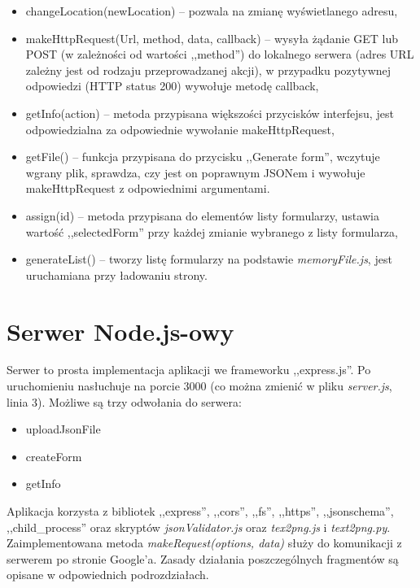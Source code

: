 \begin{itemize}
\item changeLocation(newLocation) -- pozwala na zmianę wyświetlanego adresu,
\item makeHttpRequest(Url, method, data, callback) -- wysyła żądanie GET lub POST (w zależności od wartości ,,method'') do lokalnego serwera (adres URL zależny jest od rodzaju przeprowadzanej akcji), w przypadku pozytywnej odpowiedzi (HTTP status 200) wywołuje metodę callback,
\item getInfo(action) -- metoda przypisana większości przycisków interfejsu, jest odpowiedzialna za odpowiednie wywołanie makeHttpRequest,
\item getFile() -- funkcja przypisana do przycisku ,,Generate form'', wczytuje wgrany plik, sprawdza, czy jest on poprawnym JSONem i wywołuje makeHttpRequest z odpowiednimi argumentami.
\item assign(id) -- metoda przypisana do elementów listy formularzy, ustawia wartość ,,selectedForm'' przy każdej zmianie wybranego z listy formularza,
\item generateList() -- tworzy listę formularzy na podstawie \textit{memoryFile.js}, jest uruchamiana przy ładowaniu strony.
\end{itemize}


\section{Serwer Node.js-owy}
Serwer to prosta implementacja aplikacji we frameworku ,,express.js''. Po uruchomieniu nasłuchuje na porcie 3000 (co można zmienić w pliku \textit{server.js}, linia 3). Możliwe są trzy odwołania do serwera:
\begin{itemize}
\item uploadJsonFile
\item createForm
\item getInfo
\end{itemize}
Aplikacja korzysta z bibliotek ,,express'', ,,cors'', ,,fs'', ,,https'', ,,jsonschema'', ,,child\_process''  oraz skryptów \textit{jsonValidator.js} oraz \textit{tex2png.js} i \textit{text2png.py}.
Zaimplementowana metoda \textit{makeRequest(options, data)} służy do komunikacji z serwerem po stronie Google'a.
\ind Zasady działania poszczególnych fragmentów są opisane w odpowiednich podrozdziałach.
